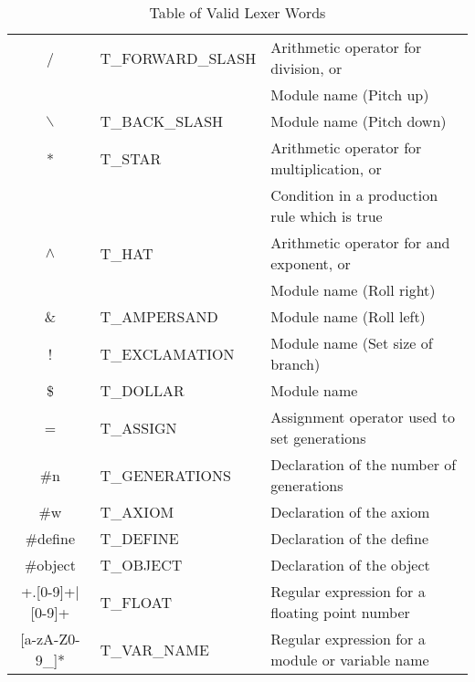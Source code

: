 \begin{flushleft}
\begin{table}[h!]
\begin{tabular}{ | c | l | l |}
\hline
	/ 				& T\_FORWARD\_SLASH 	& Arithmetic operator for division, or\\
					&						& Module name (Pitch up)\\
\hline
	$\backslash$ 		& T\_BACK\_SLASH 		& Module name (Pitch down)\\
\hline
	* 				& T\_STAR 				& Arithmetic operator for multiplication, or\\
					&						& Condition in a production rule which is true\\
\hline
	$\land$		& T\_HAT 				& Arithmetic operator for and exponent, or\\
					&						& Module name (Roll right)\\
\hline
	$\&$ 			& T\_AMPERSAND 			& Module name (Roll left)\\
\hline
	! 				& T\_EXCLAMATION 		& Module name (Set size of branch)\\
\hline
	\$ 				& T\_DOLLAR 			& Module name \\
\hline
	= 				& T\_ASSIGN 			& Assignment operator used to set generations\\
\hline
	\#n 			& T\_GENERATIONS 		& Declaration of the number of generations\\
\hline
	\#w 			& T\_AXIOM 				& Declaration of the axiom\\
\hline
	\#define 			& T\_DEFINE 		& Declaration of the define\\
\hline
	\#object 			& T\_OBJECT			& Declaration of the object\\
\hline
	[0-9]+.[0-9]+$|$[0-9]+ 					& T\_FLOAT 				& Regular expression for a floating point number\\
\hline
	[a-zA-Z\_][a-zA-Z0-9\_]*  				& T\_VAR\_NAME 			& Regular expression for a module or variable name\\
\hline
\hline
\end{tabular}
\caption{Table of Valid Lexer Words}
\label{lexer words}
\end{table}
\FloatBarrier


\end{flushleft}

